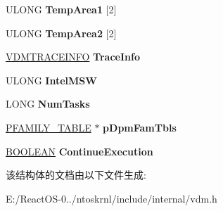 \begin{DoxyCompactItemize}
U\+L\+O\+NG {\bfseries Temp\+Area1} \mbox{[}2\mbox{]}
\item 
\mbox{\label{struct___vdm___tib_a9209aa4add7c9525f5137cda7007a92d}} 
U\+L\+O\+NG {\bfseries Temp\+Area2} \mbox{[}2\mbox{]}
\item 
\mbox{\label{struct___vdm___tib_a63bc50586863b79dfaf96e3bced1b8d7}} 
\hyperlink{struct___vdm_trace_info}{V\+D\+M\+T\+R\+A\+C\+E\+I\+N\+FO} {\bfseries Trace\+Info}
\item 
\mbox{\label{struct___vdm___tib_a72b8423a664486175b38cb99edf51568}} 
U\+L\+O\+NG {\bfseries Intel\+M\+SW}
\item 
\mbox{\label{struct___vdm___tib_a87874755e8219d3c4c2adf64fe000edc}} 
L\+O\+NG {\bfseries Num\+Tasks}
\item 
\mbox{\label{struct___vdm___tib_a22a304ee6aaabed2b5bce38882835c56}} 
\hyperlink{struct__tag_f_a_m_i_l_y___t_a_b_l_e}{P\+F\+A\+M\+I\+L\+Y\+\_\+\+T\+A\+B\+LE} $\ast$ {\bfseries p\+Dpm\+Fam\+Tbls}
\item 
\mbox{\label{struct___vdm___tib_ac522a8222e6843bd53bdd1fb8384ec7e}} 
\hyperlink{_processor_bind_8h_a112e3146cb38b6ee95e64d85842e380a}{B\+O\+O\+L\+E\+AN} {\bfseries Continue\+Execution}
\end{DoxyCompactItemize}


该结构体的文档由以下文件生成\+:\begin{DoxyCompactItemize}
\item 
E\+:/\+React\+O\+S-\/0../ntoskrnl/include/internal/vdm.\+h\end{DoxyCompactItemize}
